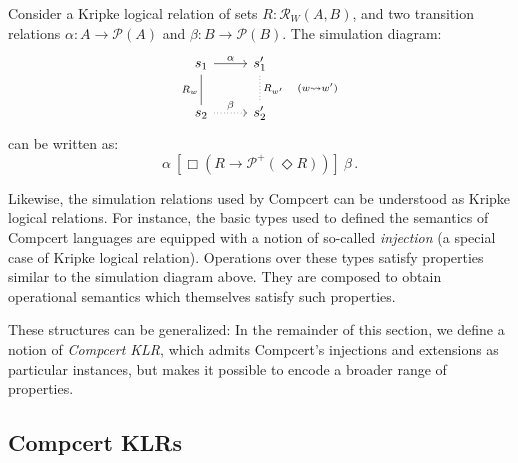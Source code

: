 \documentclass[acmsmall,anonymous]{acmart}
\newcommand{\ifr}[1]{\ [{#1}]\ }
\begin{document}
\begin{example}
Consider a Kripke logical relation of sets $R : \mathcal{R}_W(A, B)$,
and two transition relations $\alpha : A \rightarrow \mathcal{P}(A)$
and $\beta : B \rightarrow \mathcal{P}(B)$.
The simulation diagram:
\[
  \begin{tikzcd}
    s_1 \arrow[r, "\alpha"]
        \arrow[d, dash, "R_w"'] &
    s_1' \arrow[d, dotted, dash, "R_{w'} \quad (w \leadsto w')"] \\
    s_2 \arrow[r, dotted, "\beta"] &
    s_2'
  \end{tikzcd}
\]
can be written as:
\[
  \alpha \ifr{\Box (R \rightarrow \mathcal{P}^+(\Diamond R))} \beta \,.
\]
\end{example}

Likewise,
the simulation relations used by Compcert can be understood
as Kripke logical relations.
For instance,
the basic types used to defined the semantics of Compcert languages
are equipped with a notion of so-called \emph{injection}
(a special case of Kripke logical relation).
Operations over these types
satisfy properties similar to the simulation diagram above.
They are composed
to obtain operational semantics
which themselves
satisfy such properties.

These structures can be generalized:
In the remainder of this section,
we define a notion of \emph{Compcert KLR},
which admits Compcert's injections and extensions
as particular instances,
but makes it possible to encode
a broader range of properties.


\subsection{Compcert KLRs}
\end{document}
